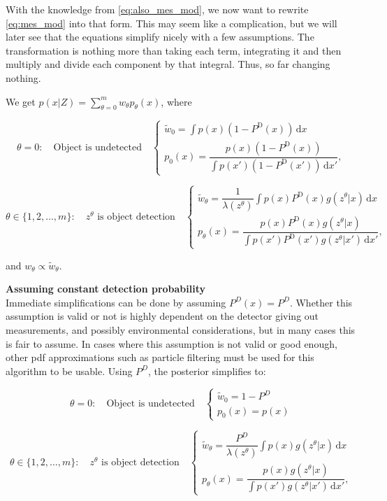 With the knowledge from \autoref{eq:also_mes_mod}, we now want to rewrite \autoref{eq:mes_mod} into that form. This may seem like a complication, but we will later see that the equations simplify nicely with a few assumptions. The transformation is nothing more than taking each term, integrating it and then multiply and divide each component by that integral. Thus, so far changing nothing.

We get $p(x|Z) = \sum_{\theta=0}^{m} w_\theta p_\theta(x)$, where

\[
\theta = 0: \quad \text{Object is undetected} \quad
\begin{cases}
\tilde{w}_0 = \int p(x)(1 - P^{\mathrm{D}}(x)) \, \mathrm{d}x \\[2mm]
p_0(x) = \dfrac{p(x)(1 - P^{\mathrm{D}}(x))}{\int p(x')(1 - P^{\mathrm{D}}(x')) \, \mathrm{d}x'},
\end{cases}
\]

\[
\theta \in \{1, 2, \ldots, m\}: \quad z^\theta \text{ is object detection} \quad
\begin{cases}
\tilde{w}_\theta = \dfrac{1}{\lambda(z^\theta)} \int p(x) P^{\mathrm{D}}(x) g(z^\theta \vert x) \, \mathrm{d}x \\[2mm]
p_\theta(x) = \dfrac{p(x) P^{\mathrm{D}}(x) g(z^\theta \vert x)}{\int p(x') P^{\mathrm{D}}(x') g(z^\theta \vert x') \, \mathrm{d}x'},
\end{cases}
\]

and $w_\theta \propto \tilde{w}_\theta$.

\textbf{Assuming constant detection probability} \\
Immediate simplifications can be done by assuming $P^D(x) = P^D$. Whether this assumption is valid or not is highly dependent on the detector giving out measurements, and possibly environmental considerations, but in many cases this is fair to assume. In cases where this assumption is not valid or good enough, other pdf approximations such as particle filtering must be used for this algorithm to be usable. Using $P^D$, the posterior simplifies to:

\[
\theta = 0: \quad \text{Object is undetected} \quad
\begin{cases}
\tilde{w}_0 = 1 - P^D \\[2mm]
p_0(x) = p(x)
\end{cases}
\]

\[
\theta \in \{1, 2, \ldots, m\}: \quad z^\theta \text{ is object detection} \quad
\begin{cases}
\tilde{w}_\theta = \dfrac{P^D}{\lambda(z^\theta)} \int p(x) g(z^\theta \vert x) \, \mathrm{d}x \\[2mm]
p_\theta(x) = \dfrac{p(x) g(z^\theta \vert x)}{\int p(x') g(z^\theta \vert x') \, \mathrm{d}x'},
\end{cases}
\]

